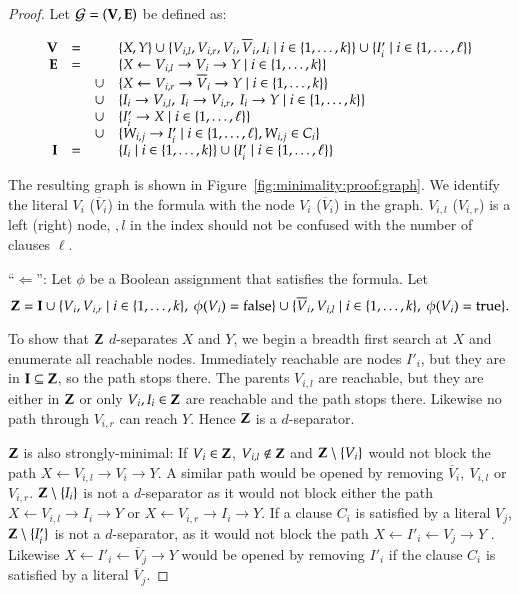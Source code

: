 \begin{proof}
Let $ {\cal G} = ({\bf V},{\bf E})  $ be defined as:

\newcommand{\forallvariables}{\mid i \in \{1,\ldots,k \}}
\newcommand{\forallclauses}{\mid i \in \{1,\ldots,\ell \}}




\[\begin{array}{rccl}
\bV &=&& \{ X, Y\} \cup \{ V_{i,l}, V_{i,r}, V_i, \overline{V}_i, I_i \forallvariables  \} \cup \{I'_i \forallclauses \}\\

\bE &=&& \{ X \gets V_{i,l} \to V_i \to Y   \forallvariables \} \\
   &&  \cup& \{ X \gets V_{i,r} \to \overline{V}_i \to Y \forallvariables \} \\
   &&  \cup& \{ I_i \to V_{i,l},\ I_i \to V_{i,r},\ I_i \to Y \forallvariables \}\\
   &&  \cup& \{ I'_i \to X \forallclauses \}\\
   &&  \cup& \{ W_{i,j} \to I'_i \forallclauses, W_{i,j} \in C_i \}\\

\bI &=&& \{I_i \forallvariables \} \cup \{I'_i \forallclauses\}
\end{array}
\]



The resulting graph is shown in Figure~\ref{fig:minimality:proof:graph}. We identify the literal $V_i$ ($ \overline{V}_i $) in the formula with the node $ V_i $ ($ \overline{V}_i $) in the graph. $V_{i,l}$ ($V_{i,r}$) is a left (right) node, $,l$ in the index should not be confused with the number of clauses $\ell$.

“$\Leftarrow$”: Let $ \phi $ be a Boolean assignment that satisfies the formula. Let 
\[
\bZ = \bI \cup \{ V_i, V_{i,r} \forallvariables,\ \phi(V_i) = \text{false} \}\cup \{ \overline{V}_i, V_{i,l} \forallvariables,\ \phi(V_i) = \text{true} \}. 
\]

To show that $ {\bf Z}  $ $ d$-separates $ X $ and $ Y $, we begin a breadth first search at $ X $ and enumerate all reachable nodes. Immediately reachable are nodes $ I'_i $, but they are in ${\bf I}\subseteq {\bf Z} $, so the path stops there. The parents $ V_{i,l} $ are reachable, but they are either in $ {\bf Z} $ or only $ V_i, I_i \in {\bf Z} $ are reachable and the path stops there. Likewise no path through $ V_{i,r} $ can reach $ Y $. Hence $ {\bf Z} $ is a $ d $-separator.

%

$ {\bf Z} $ is also strongly-minimal: If $ V_i \in {\bf Z}$, $ V_{i,l} \notin {\bf Z}  $ and $ {\bf Z}\setminus\{V_i\} $ would not block the path  $X \gets V_{i,l} \to V_i \to Y$. A similar path would be opened by removing $ \overline{V}_i,\ V_{i,l}$ or $ V_{i,r} $. $ {\bf Z} \setminus \{ I_i\} $ is not a $ d $-separator as it would not block either the path $ X \gets V_{i,l} \to I_i \to Y $ or $ X \gets V_{i,r} \to I_i \to Y $. If a clause $ C_i $ is satisfied by a literal $ V_j$, $ {\bf Z} \setminus \{ I'_i\} $ is not a $ d $-separator, as it would not block the path $ X \gets I'_i \gets V_j \to Y $ . Likewise $ X \gets I'_i \gets \overline{V}_j \to Y $ would be opened by removing $ I'_i $ if the clause $ C_i $ is satisfied by a literal $ \overline{V}_j $.


\end{proof}
